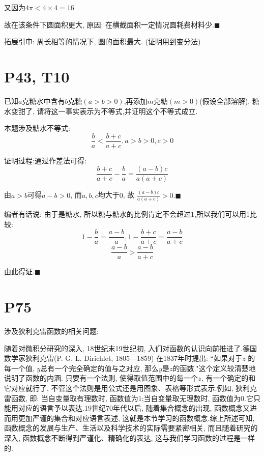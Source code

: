 \documentclass{book}
\begin{document}
    又因为$\displaystyle 4\pi < 4 \times 4 = 16$

    故在该条件下圆面积更大, 原因: 在横截面积一定情况圆耗费材料少.$\blacksquare$

    \textcolor[rgb]{0.38,0.11,0.2}{拓展引申: 周长相等的情况下, 圆的面积最大. (证明用到变分法)}
    \section{\textcolor[rgb]{0.11,0.65,0.52}{P43, T10}}
    \begin{boxB}
        已知$a$克糖水中含有$b$克糖$(a>b>0)$,再添加$m$克糖$(m>0)$(假设全部溶解), 糖水变甜了, 请将这一事实表示为不等式,并证明这个不等式成立.
    \end{boxB}

    本题涉及\textcolor[rgb]{0.38,0.11,0.2}{糖水不等式}:
    $$
    \frac{b}{a} < \frac{b+c}{a+c}, a>b>0, c>0
    $$

    证明过程:通过\textcolor[rgb]{0.75,0.17,0.22}{作差法}可得:
    $$
    \frac{b+c}{a+c} - \frac{b}{a} = \frac{(a-b)c}{a(a+c)}
    $$

    由$a>b$可得$a-b>0$, 而$a,b,c$均大于$0$, 故 $\displaystyle \frac{(a-b)c}{a(a+c)}>0. \blacksquare$

    编者有话说: 由于是糖水, 所以糖与糖水的比例肯定不会超过1,所以我们可以用1比较:
    $$
    1-\frac{b}{a}=\frac{a-b}{a},1-\frac{b+c}{a+c}=\frac{a-b}{a+c}
    $$
    $$
    \frac{a-b}{a}>\frac{a-b}{a+c}
    $$

    由此得证.$\blacksquare$

    \section{\textcolor[rgb]{0.11,0.65,0.52}{P75}}
    涉及\textcolor[rgb]{0.38,0.11,0.2}{狄利克雷函数}的相关问题:

    随着对微积分研究的深入, 18世纪末19世纪初, 入们对函数的认识向前推进了.德国数学家狄利克雷(P. G. L. Dirichlet, 1805—1859) 在1837年时提出: ``如果对于$z$ 的每一个值, $y$总有一个完全确定的值与之对应, 那么$y$是$z$的函数."这个定义较清楚地说明了函数的内涵. 只要有一个法则, 使得取值范围中的每一个$z$, 有一个确定的和它对应就行了, 不管这个法则是用公式还是用图象、表格等形式表示.例如, 狄利克雷函数, 即: 当自变量取有理数时, 函数值为1;当自变量取无理数时, 函数值为0.它只能用对应的语言予以表达.19世纪70年代以后, 随着集合概念的出现, 函数概念又进而用更加严谨的集合和对应语言表述, 这就是本节学习的函数概念.综上所述可知, 函数概念的发展与生产、生活以及科学技术的实际需要紧密相关, 而且随着研究的深入, 函数概念不断得到严谨化、精确化的表达, 这与我们学习函数的过程是一样的.
\end{document}
